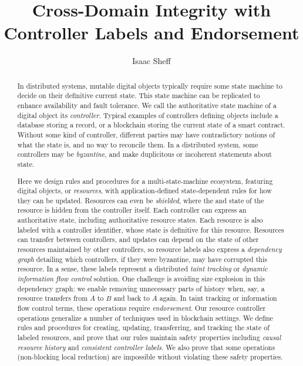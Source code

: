 \documentclass[a4paper,USenglish,cleveref, autoref, thm-restate, anonymous]{lipics-v2021}
\title{Cross-Domain Integrity with Controller Labels and Endorsement}%
\author{Isaac Sheff}{Heliax, Buffalo, USA \and \url{https://isaacsheff.com} }{isaac@heliax.dev}{https://orcid.org/0000-0002-1825-0097}{[(Optional) author-specific funding acknowledgements]}%
\begin{document}
\maketitle

\begin{abstract}
In distributed systems, mutable digital objects typically require some state machine to decide on their definitive current state.
This state machine can be replicated to enhance availability and fault tolerance.
We call the authoritative state machine of a digital object its \emph{controller}.
Typical examples of controllers defining objects include a database storing a record, or a blockchain storing the current state of a smart contract.
Without some kind of controller, different parties may have contradictory notions of what the state is, and no way to reconcile them.
In a distributed system, some controllers may be \emph{byzantine}, and make duplicitous or incoherent statements about state. 

Here we design rules and procedures for a multi-state-machine ecosystem, featuring digital objects, or \emph{resources}, with application-defined state-dependent rules for how they can be updated. 
Resources can even be \emph{shielded}, where the and state of the resource is hidden from the controller itself. 
Each controller can express an authoritative state, including authoritative resource states. 
Each resource is also labeled with a controller identifier, whose state is definitive for this resource. 
Resources can transfer between controllers, and updates can depend on the state of other resources maintained by other controllers, so resource labels also express a \emph{dependency graph} detailing which controllers, if they were byzantine, may have corrupted this resource.
In a sense, these labels represent a distributed \emph{taint tracking} or \emph{dynamic information flow control} solution.
One challenge is avoiding size explosion in this dependency graph: we enable removing unnecessary parts of history when, say, a resource transfers from $A$ to $B$ and back to $A$ again.
In taint tracking or information flow control terms, these operations require \emph{endorsement}.
Our resource controller operations generalize a number of techniques used in blockchain settings.
We define rules and procedures for creating, updating, transferring, and tracking the state of labeled resources, and prove that our rules maintain safety properties including \emph{causal resource history} and \emph{consistent controller labels}.
We also prove that some operations (non-blocking local reduction) are impossible without violating these safety properties. 
\end{abstract}
\end{document}
